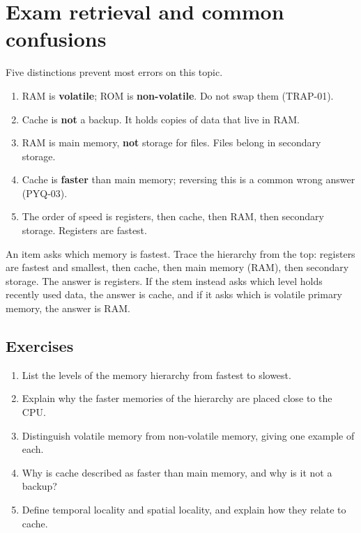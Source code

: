 \section{Exam retrieval and common confusions}
Five distinctions prevent most errors on this topic.
\begin{enumerate}
  \item RAM is \textbf{volatile}; ROM is \textbf{non-volatile}. Do not swap
    them (TRAP-01).
  \item Cache is \textbf{not} a backup. It holds copies of data that live in
    RAM.
  \item RAM is main memory, \textbf{not} storage for files. Files belong in
    secondary storage.
  \item Cache is \textbf{faster} than main memory; reversing this is a common
    wrong answer (PYQ-03).
  \item The order of speed is registers, then cache, then RAM, then
    secondary storage. Registers are fastest.
\end{enumerate}

\begin{example}
An item asks which memory is fastest. Trace the hierarchy from the top:
registers are fastest and smallest, then cache, then main memory (RAM), then
secondary storage. The answer is registers. If the stem instead asks which
level holds recently used data, the answer is cache, and if it asks which is
volatile primary memory, the answer is RAM.
\end{example}

\subsection*{Exercises}
\begin{enumerate}[label=\arabic*.]
  \item List the levels of the memory hierarchy from fastest to slowest.
  \item Explain why the faster memories of the hierarchy are placed close to
    the CPU.
  \item Distinguish volatile memory from non-volatile memory, giving one
    example of each.
  \item Why is cache described as faster than main memory, and why is it not
    a backup?
  \item Define temporal locality and spatial locality, and explain how they
    relate to cache.
\end{enumerate}

